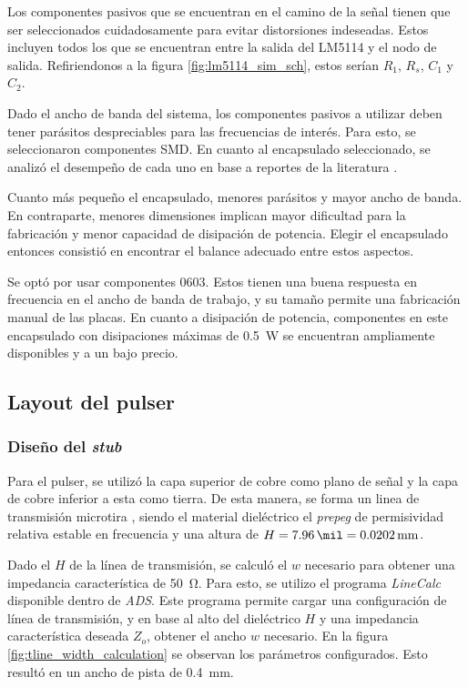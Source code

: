 Los componentes pasivos que se encuentran en el camino de la señal tienen que
ser seleccionados cuidadosamente para evitar distorsiones indeseadas. Estos
incluyen todos los que se encuentran entre la salida del LM5114 y el nodo de
salida. Refiriendonos a la figura \ref{fig:lm5114_sim_sch}, estos serían $R_1$,
$R_s$, $C_1$ y $C_2$.

Dado el ancho de banda del sistema, los componentes pasivos a utilizar deben
tener parásitos despreciables para las frecuencias de interés. Para esto, se
seleccionaron componentes SMD. En cuanto al encapsulado seleccionado, se analizó
el desempeño de cada uno en base a reportes de la literatura
\cite{vishayFreqResp}.

Cuanto más pequeño el encapsulado, menores parásitos y mayor ancho de banda. En
contraparte, menores dimensiones implican mayor dificultad para la fabricación y
menor capacidad de disipación de potencia. Elegir el encapsulado entonces
consistió en encontrar el balance adecuado entre estos aspectos.

Se optó por usar componentes 0603. Estos tienen una buena respuesta en
frecuencia en el ancho de banda de trabajo, y su tamaño permite una fabricación
manual de las placas. En cuanto a disipación de potencia, componentes en este
encapsulado con disipaciones máximas de \qty{0.5}{\watt} se encuentran
ampliamente disponibles y a un bajo precio.

\subsection{Layout del pulser}

\subsubsection{Diseño del \textit{stub}}

Para el pulser, se utilizó la capa superior de cobre como plano de señal y la
capa de cobre inferior a esta como tierra. De esta manera, se forma un linea de
transmisión microtira \cite{pozar2011}, siendo el material dieléctrico el
\textit{prepeg} de permisividad relativa estable en frecuencia y una altura de
$H = \qty{7.96}{\mil} = \qty{0.0202}{\milli\meter}$.

Dado el $H$ de la línea de transmisión, se calculó el $w$ necesario para obtener
una impedancia característica de \qty{50}{\ohm}. Para esto, se utilizo el
programa \textit{LineCalc} disponible dentro de \textit{ADS}. Este programa
permite cargar una configuración de línea de transmisión, y en base al alto del
dieléctrico $H$ y una impedancia característica deseada $Z_o$, obtener el ancho
$w$ necesario. En la figura \ref{fig:tline_width_calculation} se observan los
parámetros configurados. Esto resultó en un ancho de pista de
\qty{0.4}{\milli\meter}.

